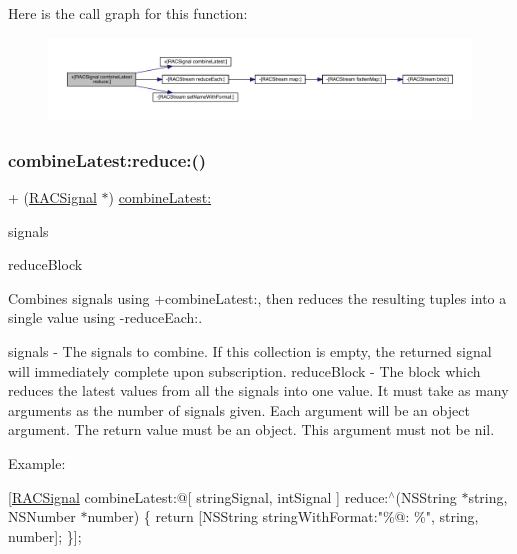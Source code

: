Here is the call graph for this function\+:\nopagebreak
\begin{figure}[H]
\begin{center}
\leavevmode
\includegraphics[width=350pt]{interface_r_a_c_signal_a5e4d2db914a14c415646d9fdda131221_cgraph}
\end{center}
\end{figure}
\mbox{\label{interface_r_a_c_signal_a5e4d2db914a14c415646d9fdda131221}} 
\subsubsection{\texorpdfstring{combine\+Latest\+:reduce\+:()}{combineLatest:reduce:()}\hspace{0.1cm}{\footnotesize\ttfamily [2/3]}}
{\footnotesize\ttfamily + (\mbox{\hyperlink{interface_r_a_c_signal}{R\+A\+C\+Signal}} $\ast$) \mbox{\hyperlink{category_r_a_c_signal_07_operations_08_a8a7a563a48665fb1203e2b37db6e5e98}{combine\+Latest\+:}} \begin{DoxyParamCaption}\item[{(id$<$ N\+S\+Fast\+Enumeration $>$)}]{signals }\item[{reduce:(id($^\wedge$)())}]{reduce\+Block }\end{DoxyParamCaption}}

Combines signals using +combine\+Latest\+:, then reduces the resulting tuples into a single value using -\/reduce\+Each\+:.

signals -\/ The signals to combine. If this collection is empty, the returned signal will immediately complete upon subscription. reduce\+Block -\/ The block which reduces the latest values from all the signals into one value. It must take as many arguments as the number of signals given. Each argument will be an object argument. The return value must be an object. This argument must not be nil.

Example\+:

\mbox{[}\mbox{\hyperlink{interface_r_a_c_signal}{R\+A\+C\+Signal}} combine\+Latest\+:@\mbox{[} string\+Signal, int\+Signal \mbox{]} reduce\+:$^\wedge$(N\+S\+String $\ast$string, N\+S\+Number $\ast$number) \{ return \mbox{[}N\+S\+String string\+With\+Format\+:"\%@\+: \%", string, number\mbox{]}; \}\mbox{]};

